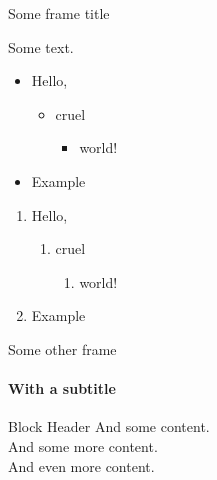 
\begin{frame}{Some frame title}

Some text.
\begin{itemize}
    \item Hello,
    \begin{itemize}
        \item cruel
        \begin{itemize}
            \item world!
        \end{itemize}
    \end{itemize}
    \item Example
\end{itemize}

\begin{enumerate}
    \item Hello,
    \begin{enumerate}
        \item cruel
        \begin{enumerate}
            \item world!
        \end{enumerate}
    \end{enumerate}
    \item Example
\end{enumerate}

\end{frame}


\begin{frame}{Some other frame}
\framesubtitle{With a subtitle}

\begin{block}{Block Header}
And some content.\\
And some more content.\\
And even more content.
\end{block}

\end{frame}

